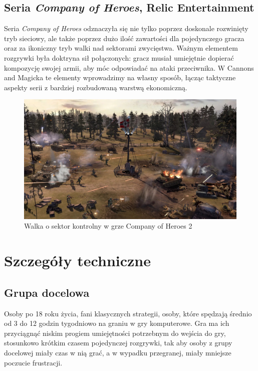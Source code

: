 \documentclass[a4paper]{scrreprt}
\def \GameTiTle{Cannons and Magicka}
\begin{document}
\section{Seria \emph{Company of Heroes}, Relic Entertainment}
Seria \emph{Company of Heroes} odznaczyła się nie tylko poprzez doskonale rozwinięty tryb sieciowy, ale także poprzez dużo ilość zawartości dla pojedynczego gracza oraz za ikoniczny tryb walki nad sektorami zwycięstwa. Ważnym elementem rozgrywki była doktryna sił połączonych: gracz musiał umiejętnie dopierać kompozycję swojej armii, aby móc odpowiadać na ataki przeciwnika. 
W \GameTiTle{} te elementy wprowadzimy na własny sposób, łącząc taktyczne aspekty serii z bardziej rozbudowaną warstwą ekonomiczną.

\begin{figure}[hb]
    \centering
    \includegraphics[width=1\textwidth]{coh2.jpg}
    \caption{\label{} Walka o sektor kontrolny w grze Company of Heroes 2}
    \end{figure}


\chapter{Szczegóły techniczne}

\section{Grupa docelowa}
Osoby po 18 roku życia, fani klasycznych strategii, osoby, które spędzają średnio od 3 do 12 godzin tygodniowo na graniu w gry komputerowe. Gra ma ich przyciągnąć niskim progiem umiejętności potrzebnym do wejścia do gry, stosunkowo krótkim czasem pojedynczej rozgrywki, tak aby osoby z grupy docelowej miały czas w nią grać, a w wypadku przegranej, miały mniejsze poczucie frustracji.
\end{document}

